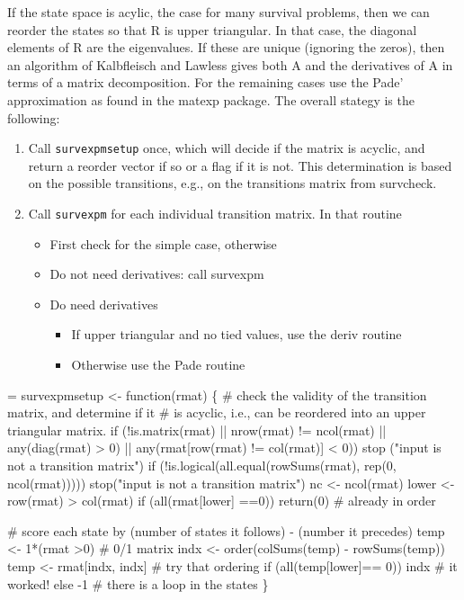 \documentclass{article}
\newcommand{\code}[1]{\texttt{#1}}
\begin{document}
If the state space is acylic, the case for many survival problems, then
we can reorder the states so that R is upper triangular.
In that case, the diagonal elements of R are the eigenvalues.  If these
are unique (ignoring the zeros), then an algorithm of Kalbfleisch and Lawless
gives both A and the derivatives of A in terms of a matrix decomposition.
For the remaining cases use the Pade' approximation as found in the
matexp package.
The overall stategy is the following:
\begin{enumerate} 
  \item Call \code{survexpmsetup} once, which will decide if the matrix is
    acyclic, and return a reorder vector if so or a flag if it is not.
    This determination is based on the possible transitions, e.g., on the
    transitions matrix from survcheck.
  \item Call \code{survexpm} for each individual transition matrix.
    In that routine
    \begin{itemize}
      \item First check for the simple case, otherwise
      \item Do not need derivatives: call survexpm
      \item Do need derivatives
        \begin{itemize}
          \item If upper triangular and no tied values, use the deriv routine
          \item Otherwise use the Pade routine
        \end{itemize}
    \end{itemize}
\end{enumerate}

\begin{nwchunk}
=
 survexpmsetup <- function(rmat) \{
     # check the validity of the transition matrix, and determine if it
     #  is acyclic, i.e., can be reordered into an upper triangular matrix.
     if (!is.matrix(rmat) || nrow(rmat) != ncol(rmat) || any(diag(rmat) > 0) ||
         any(rmat[row(rmat) != col(rmat)] < 0))
         stop ("input is not a transition matrix")
     if (!is.logical(all.equal(rowSums(rmat), rep(0, ncol(rmat)))))
         stop("input is not a transition matrix")
     nc <- ncol(rmat)
     lower <- row(rmat) > col(rmat)
     if (all(rmat[lower] ==0))  return(0)  # already in order
     
     # score each state by (number of states it follows) - (number it precedes)
     temp <- 1*(rmat >0) # 0/1 matrix
     indx <- order(colSums(temp) - rowSums(temp))
     temp <- rmat[indx, indx]  # try that ordering
     if (all(temp[lower]== 0)) indx  # it worked!
     else -1  # there is a loop in the states
 \}
\end{nwchunk}
\end{document}
